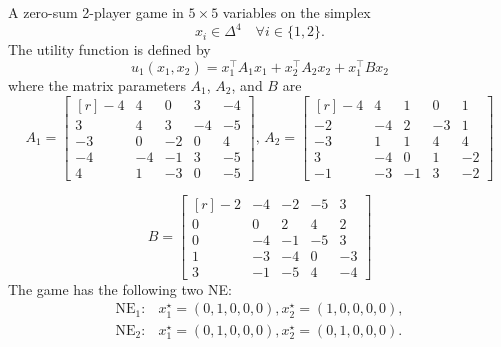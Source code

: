 \begin{game}\label{ex.nie21.6.10}

A zero-sum 2-player game in $5 \times 5$ variables on the simplex
\[
x_i \in \Delta^{4} \quad \forall i \in \{1,2\}.
\]
The utility function is defined by \cite[Example~6.10]{nie.yang.ea:saddle}
\[
u_1(x_1, x_2) = x_1^\top A_1 x_1 + x_2^\top A_2 x_2 + x_1^\top B x_2
\]
where the matrix parameters $A_1$, $A_2$, and $B$ are
\[
A_1 = \begin{bmatrix*}[r]
-4 & 4 & 0 & 3 & -4 \\
3 & 4 & 3 & -4 & -5 \\
-3 & 0 & -2 & 0 & 4 \\
-4 & -4 & -1 & 3 & -5 \\
4 & 1 & -3 & 0 & -5
\end{bmatrix*},\, A_2 = \begin{bmatrix*}[r]
-4 & 4 & 1 & 0 & 1 \\
-2 & -4 & 2 & -3 & 1 \\
-3 & 1 & 1 & 4 & 4 \\
3 & -4 & 0 & 1 & -2 \\
-1 & -3 & -1 & 3 & -2
\end{bmatrix*}
\]

\[
B = \begin{bmatrix*}[r]
-2 & -4 & -2 & -5 & 3 \\
0 & 0 & 2 & 4 & 2 \\
0 & -4 & -1 & -5 & 3 \\
1 & -3 & -4 & 0 & -3 \\
3 & -1 & -5 & 4 & -4
\end{bmatrix*}
\]
The game has the following two NE:
\begin{align*}
    \text{NE}_1: &x_1^\star = (0, 1, 0, 0, 0), x_2^\star = (1, 0, 0, 0, 0),\\
    \text{NE}_2: &x_1^\star = (0, 1, 0, 0, 0), x_2^\star = (0, 1, 0, 0, 0).
\end{align*}
\end{game}